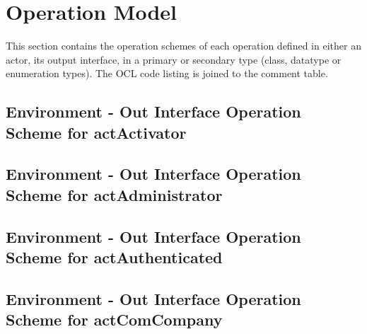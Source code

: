 \chapter{Operation Model}
\label{chap:lu.uni.lassy.excalibur.examples.icrash-OM}

This section contains the operation schemes of each operation defined in either an actor, its output interface, in a primary or secondary type (class, datatype or enumeration types). 
The \msrmessir OCL code listing is joined to the comment table.

\lstset{
float,
basicstyle=\scriptsize,
language=Messir,
breakatwhitespace=false,
tabsize=2,
breaklines=true,
numbers=left,
emptylines=1,
numbersep=5pt,
showspaces=false,
showstringspaces=false,
showtabs=false
} 



		
\section{Environment - Out Interface Operation Scheme for actActivator}
\label{OM-EM-OutInterface-OS-actActivator}


\section{Environment - Out Interface Operation Scheme for actAdministrator}
\label{OM-EM-OutInterface-OS-actAdministrator}


\section{Environment - Out Interface Operation Scheme for actAuthenticated}
\label{OM-EM-OutInterface-OS-actAuthenticated}


\section{Environment - Out Interface Operation Scheme for actComCompany}
\label{OM-EM-OutInterface-OS-actComCompany}

